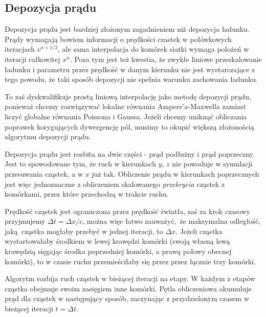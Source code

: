 \subsection{Depozycja prądu} %

Depozycja prądu jest bardziej złożonym zagadnieniem niż depozycja ładunku.
Prądy wymagają bowiem informacji o prędkości czastek w połówkowych
iteracjach $v^{n+1/2}$, ale sama interpolacja do komórek siatki wymaga
położeń w iteracji całkowitej $x^{n}$. Poza tym jest też kwestia, że zwykłe
liniowe przeskalowanie ładunku i parametru  przez prędkość w
danym kierunku nie jest wystarczające z tego powodu, że taki sposób
depozycji nie spełnia warunku zachowania ładunku.



To zaś dyskwalifikuje prostą liniową interpolację jako metodę depozycji
prądu, ponieważ chcemy rozwiązywać lokalne równania Ampere'a-Maxwella
zamiast liczyć globalne równania Poissona i Gaussa.
Jeżeli chcemy uniknąć obliczania poprawek korygujących dywergencję pól,
musimy to okupić większą złożonością algorytmu depozycji prądu.

Depozycja prądu jest rozbita na dwie części - prąd podłużny i prąd
poprzeczny. Jest to spowodowane tym, że ruch w kierunkach $y$, $z$ nie
powoduje w symulacji przesuwania cząstek, a w $x$ już tak. Obliczenie prądu
w kierunkach poprzecznych jest więc jednoznaczne z obliczeniem skalowanego
\emph{przekrycia} cząstek z komórkami, przez które przechodzą w trakcie
ruchu.

Prędkość cząstek jest ograniczona przez prędkość światła, zaś za krok czasowy
przyjmujemy $\Delta t = \Delta x/c$, można więc łatwo zauważyć, że maksymalna
odległość, jaką cząstka mogłaby przebyć w jednej iteracji, to $\Delta x$.
Jeżeli cząstka wystartowałaby środkiem w lewej krawędzi komórki (swoją
własną lewą krawędzią sięgając środka poprzedniej komórki, a prawą połowy
obecnej komórki), to w czasie ruchu przemieściłaby się przez
przez łącznie trzy komórki.  %

Algorytm rozbija ruch cząstek w bieżącej iteracji na etapy. W każdym z
etapów cząstka obejmuje swoim zasięgiem inne komórki. Pętla obliczeniowa
akumuluje prąd dla cząstek w następujący sposób, zaczynając z przydzielonym
czasem w bieżącej iteracji $t = \Delta t$.

